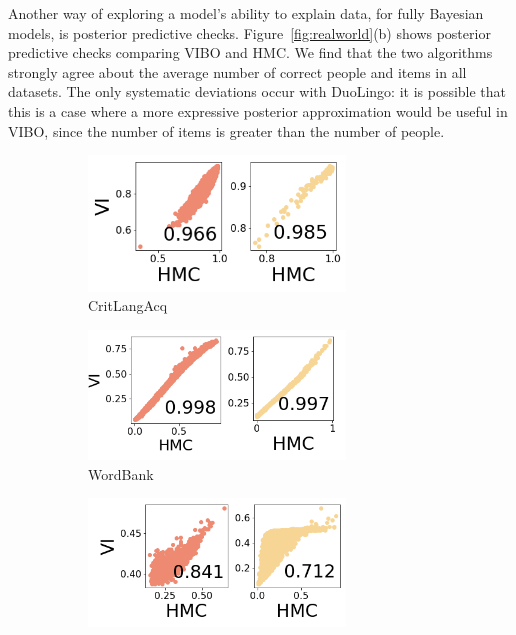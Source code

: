 Another way of exploring a model's ability to explain data, for fully Bayesian models, is posterior predictive checks.
Figure~\ref{fig:realworld}(b) shows posterior predictive checks comparing VIBO and HMC.
We find that the two algorithms strongly agree about the average number of correct people and items in all datasets.
The only systematic deviations occur with DuoLingo: it is possible that this is a case where a more expressive posterior approximation would be useful in VIBO, since the number of items is greater than the number of people.

\begin{figure}
    \begin{subfigure}[b]{0.5\textwidth}
        \centering
        \includegraphics[width=0.75\textwidth]{images/chapter7/posterior_predictives/critlangacq.png}
        \caption{CritLangAcq}
    \end{subfigure}
    \begin{subfigure}[b]{0.5\textwidth}
        \centering
        \includegraphics[width=0.75\textwidth]{images/chapter7/posterior_predictives/wordbank.png}
        \caption{WordBank}
    \end{subfigure}
    \begin{subfigure}[b]{0.5\textwidth}
        \centering
        \includegraphics[width=0.75\textwidth]{images/chapter7/posterior_predictives/duolingo.png}

\end{subfigure}
\end{figure}
